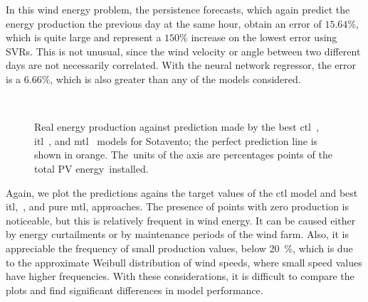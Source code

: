 %
In this wind energy problem, the persistence forecasts, which again predict the energy production the previous day at the same hour, obtain an error of $15.64\%$, which is quite large and represent a $150\%$ increase on the lowest error using SVRs. This is not unusual, since the wind velocity or angle between two different days are not necessarily correlated.
%
With the neural network regressor, the error is a $6.66\%$, which is also greater than any of the models considered.

\begin{figure}[t!]
    \centering%
    \quad%
    \quad%
    \\
 \caption{\label{fig:stv_best_plots} Real energy production against prediction made by the best \acrshort{ctl}~\protect{}, \acrshort{itl}~\protect{}, and \acrshort{mtl}~\protect{} models for Sotavento; the perfect prediction line is shown in orange. The~units of the axis are percentages points of the total PV energy~installed.}
 \end{figure}

%
Again, we plot the predictions agains the target values of the \acrshort{ctl} model and best \acrshort{itl},~, and pure \acrshort{mtl},  approaches.
The presence of points with zero production is noticeable, but this is relatively frequent in wind energy. It can be caused either by energy curtailments or by maintenance periods of the wind farm.
Also, it is appreciable the frequency of small production values, below \SI{20}{\percent}, which is due to the approximate Weibull distribution of wind speeds, where small speed values have higher frequencies. 
With these considerations, it is difficult to compare the plots and find significant differences in model performance.








